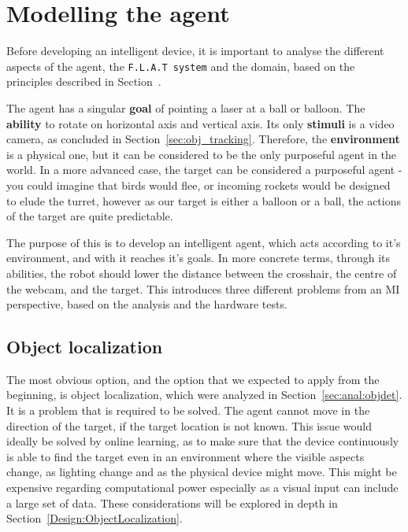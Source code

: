 \section{Modelling the agent}\label{Design:MI}
Before developing an intelligent device, it is important to analyse the different aspects of the agent, the \texttt{F.L.A.T system} and the domain, based on the principles described in Section~.


The agent has a singular \textbf{goal} of pointing a laser at a ball or balloon.
The \textbf{ability} to rotate on horizontal axis and vertical axis.
Its only \textbf{stimuli} is a video camera, as concluded in Section~\ref{sec:obj_tracking}.
Therefore, the \textbf{environment} is a physical one, but it can be considered to be the only purposeful agent in the world.
In a more advanced case, the target can be considered a purposeful agent - you could imagine that birds would flee, or incoming rockets would be designed to elude the turret, however as our target is either a balloon or a ball, the actions of the target are quite predictable.

The purpose of this is to develop an intelligent agent, which acts according to it's environment, and with it reaches it's goals.
In more concrete terms, through its abilities, the robot should lower the distance between the crosshair, the centre of the webcam, and the target.
This introduces three different problems from an MI perspective, based on the analysis and the hardware tests.

\subsection{Object localization}
The most obvious option, and the option that we expected to apply from the beginning, is object localization, which were analyzed in Section~\ref{sec:anal:objdet}.
It is a problem that is required to be solved. The agent cannot move in the direction of the target, if the target location is not known.
This issue would ideally be solved by online learning, as to make sure that the device continuously is able to find the target even in an environment where the visible aspects change, as lighting change and as the physical device might move. 
This might be expensive regarding computational power especially as a visual input can include a large set of data.
These considerations will be explored in depth in Section~\ref{Design:ObjectLocalization}.

